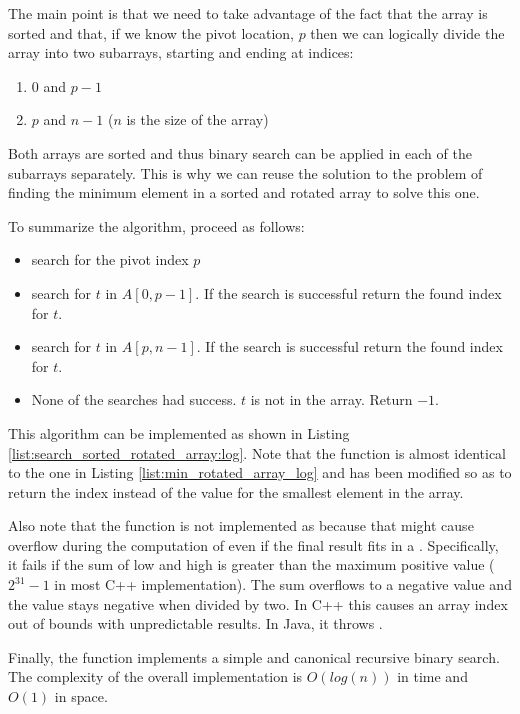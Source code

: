 The main point is that we need to take advantage of the fact that the array is sorted and that, if we know the pivot location, $p$ then we can logically divide the array into two subarrays, starting and ending at indices:
\begin{enumerate}
	\item $0$ and $p-1$
	\item $p$ and $n-1$ ($n$ is the size of the array)
\end{enumerate}
Both arrays are sorted and thus binary search can be applied in each of the subarrays separately. This is why we can reuse the solution to the problem of finding the minimum element in a sorted and rotated array to solve this one.

To summarize the algorithm, proceed as follows:
\begin{itemize}
	\item search for the pivot index $p$
	\item search for $t$ in $A[0,p-1]$. If the search is successful return the found index for $t$.
	\item search for $t$ in $A[p,n-1]$.  If the search is successful return the found index for $t$.
	\item None of the searches had success. $t$ is not in the array. Return $-1$.
\end{itemize}

This algorithm can be implemented as shown in Listing \ref{list:search_sorted_rotated_array:log}. Note that the function  is almost identical to the one in Listing \ref{list:min_rotated_array_log} and has been modified so as to return the index instead of the value for the smallest element in the array.

Also note that the function  is not implemented as  because that might cause overflow during the computation of  even if the final result fits in a . Specifically, it fails if the sum of low and high is greater than the maximum positive  value ($2^{31} - 1$ in most C++ implementation). The sum overflows to a negative value and the value stays negative when divided by two. In C++ this causes an array index out of bounds with unpredictable results. In Java, it throws .

Finally, the function  implements a simple and canonical recursive binary search. 
The complexity of the overall implementation is $O(log(n))$ in time and $O(1)$ in space.


